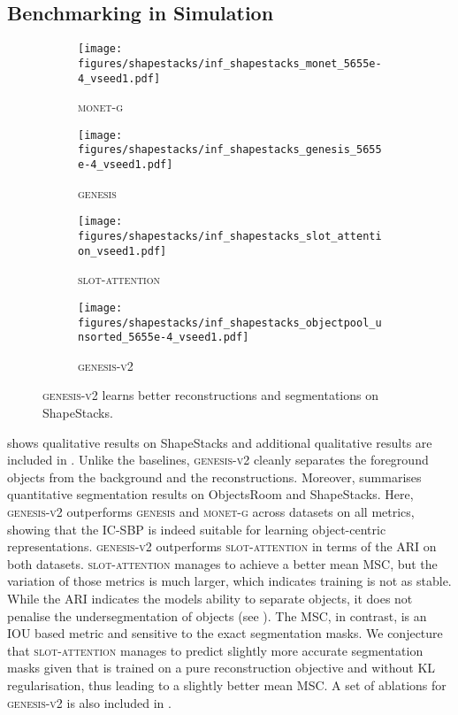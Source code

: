 \documentclass{article}
\begin{document}
\subsection{Benchmarking in Simulation}

\begin{figure}
	\centering
	\begin{subfigure}{0.259\linewidth}
		\texttt{[image: figures/shapestacks/inf\_shapestacks\_monet\_5655e-4\_vseed1.pdf]}
		\caption{\textsc{monet-g}}
	\end{subfigure}
	\begin{subfigure}{0.24\linewidth}
		\texttt{[image: figures/shapestacks/inf\_shapestacks\_genesis\_5655e-4\_vseed1.pdf]}
		\caption{\textsc{genesis}}
	\end{subfigure}
	\begin{subfigure}{0.24\linewidth}
		\texttt{[image: figures/shapestacks/inf\_shapestacks\_slot\_attention\_vseed1.pdf]}
		\caption{\textsc{slot-attention}}
	\end{subfigure}
	\begin{subfigure}{0.24\linewidth}
		\texttt{[image: figures/shapestacks/inf\_shapestacks\_objectpool\_unsorted\_5655e-4\_vseed1.pdf]}
		\caption{\textsc{genesis-v2}}
	\end{subfigure}
	\caption{\textsc{genesis-v2} learns better reconstructions and segmentations on ShapeStacks.}
	\label{fig:gpp:shapestacks:seg}
\end{figure}

 shows qualitative results on ShapeStacks and additional qualitative results are included in .
Unlike the baselines, \textsc{genesis-v2} cleanly separates the foreground objects from the background and the reconstructions.
Moreover,  summarises quantitative segmentation results on ObjectsRoom and ShapeStacks.
Here, \textsc{genesis-v2} outperforms \textsc{genesis} and \textsc{monet-g} across datasets on all metrics, showing that the IC-SBP is indeed suitable for learning object-centric representations.
\textsc{genesis-v2} outperforms \textsc{slot-attention} in terms of the ARI on both datasets.
\textsc{slot-attention} manages to achieve a better mean MSC, but the variation of those metrics is much larger, which indicates training is not as stable.
While the ARI indicates the models ability to separate objects, it does not penalise the undersegmentation of objects (see \cite{engelcke2020genesis}).
The MSC, in contrast, is an IOU based metric and sensitive to the exact segmentation masks.
We conjecture that \textsc{slot-attention} manages to predict slightly more accurate segmentation masks given that is trained on a pure reconstruction objective and without KL regularisation, thus leading to a slightly better mean MSC.
A set of ablations for \textsc{genesis-v2} is also included in .
\end{document}
